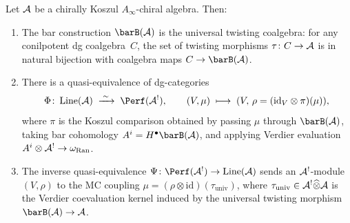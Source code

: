\begin{theorem}
\label{thm:mc-couplings-perf}
Let $\mathcal{A}$ be a chirally Koszul $A_\infty$-chiral algebra. Then:
\begin{enumerate}[label=\textup{(\roman*)}]
\item The bar construction $\barB(\cA)$ is the universal twisting
 coalgebra: for any conilpotent dg coalgebra~$C$, the set of
 twisting morphisms $\tau \colon C \to \mathcal{A}$ is in natural bijection
 with coalgebra maps $C \to \barB(\cA)$.

\item There is a quasi-equivalence of dg-categories
 \[
 \Phi \colon \operatorname{Line}(\cA)
 \;\xrightarrow{\;\sim\;}\;
 \Perf(\cA^!),
 \qquad
 (V, \mu)
 \;\longmapsto\;
 (V,\, \rho = (\mathrm{id}_V \otimes \pi)(\mu)),
 \]
 where $\pi$ is the Koszul comparison obtained by passing
 $\mu$ through $\barB(\cA)$, taking bar cohomology
 $A^i=H^\bullet\barB(\cA)$, and applying Verdier evaluation
 $A^i\otimes\mathcal{A}^!\to\omega_{\operatorname{Ran}}$.

\item The inverse quasi-equivalence
 $\Psi \colon \Perf(\cA^!) \to \operatorname{Line}(\cA)$
 sends an $\mathcal{A}^!$-module $(V, \rho)$ to the MC coupling
 $\mu = (\rho \otimes \mathrm{id})(\tau_{\mathrm{univ}})$,
 where $\tau_{\mathrm{univ}} \in \mathcal{A}^! \widehat\otimes \mathcal{A}$
 is the Verdier coevaluation kernel induced by the universal
 twisting morphism $\barB(\cA)\to\cA$.
\end{enumerate}
\end{theorem}

